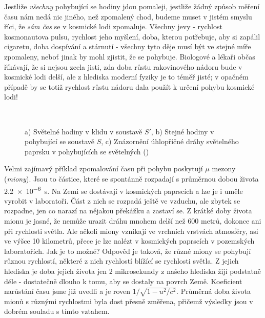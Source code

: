     Jestliže \emph{všechny} pohybující se hodiny jdou pomaleji, jestliže žádný způsob měření času 
    nám nedá nic jiného, než zpomalený chod, budeme muset v jistém smyslu říci, že \emph{sám čas} 
    se v kosmické lodi zpomaluje. Všechny jevy - rychlost kosmonautova pulsu, rychlost jeho 
    myšlení, doba, kterou potřebuje, aby si zapálil cigaretu, doba dospívání a stárnutí - všechny 
    tyto děje musí být ve stejné míře zpomaleny, neboť jinak by mohl zjistit, že se pohybuje. 
    Biologové a lékaři občas říkávají, že si nejsou zcela jisti, zda doba růstu rakovinového nádoru 
    bude v kosmické lodi delší, ale z hlediska moderní fyziky je to téměř jisté; v opačném případě 
    by se totiž rychlost růstu nádoru dala použít k určení pohybu kosmické lodi!
    
    \begin{figure}[ht!]  %
      \centering
           \hspace{1em}
           \\
      \caption{a) Světelné hodiny v klidu v soustavě \(S'\), b) Stejné hodiny v pohybující se 
               soustavě \(S\), c) Znázornění úhlopříčné dráhy světelného paprsku v pohybujících se
               světelných  (\cite[s.~217]{Feynman01})}
      \label{fyz:fig0003}
    \end{figure}
    
    Velmi zajímavý příklad zpomalování času při pohybu poskytují \(\mu\) mezony (\emph{miony}). 
    Jsou to částice, které se spontánně rozpadají s průměrnou dobou života \SI{2.2e-6}{\s}. Na Zemi 
    se dostávají v kosmických paprscích a lze je i uměle vyrobit v laboratoři. Část z nich se 
    rozpadá ještě ve vzduchu, ale zbytek se rozpadne, jen co narazí na nějakou překážku a zastaví 
    se. Z krátké doby života mionu je jasné, že nemůže urazit dráhu mnohem delší než \num{600} 
    metrů, dokonce ani při rychlosti světla. Ale ačkoli miony vznikají ve vrchních vrstvách 
    atmosféry, asi ve výšce \num{10} kilometrů, přece je lze nalézt v kosmických paprscích v 
    pozemských laboratořích. Jak je to možné? Odpověď je taková, že různé miony se pohybují různou 
    rychlostí, některé z nich rychlostí blížící se rychlosti světla. Z jejich hlediska je doba 
    jejich života jen \num{2} mikrosekundy z našeho hlediska žijí podstatně déle - dostatečně 
    dlouho k tomu, aby se dostaly na povrch Země. Koeficient narůstání času jsme již uvedli a je 
    roven \(1/\sqrt{1 - u^2/c^2}\). Průměrná doba života mionů s různými rychlostmi byla dost 
    přesně změřena, přičemž výsledky jsou v dobrém souladu s tímto vztahem.
    
